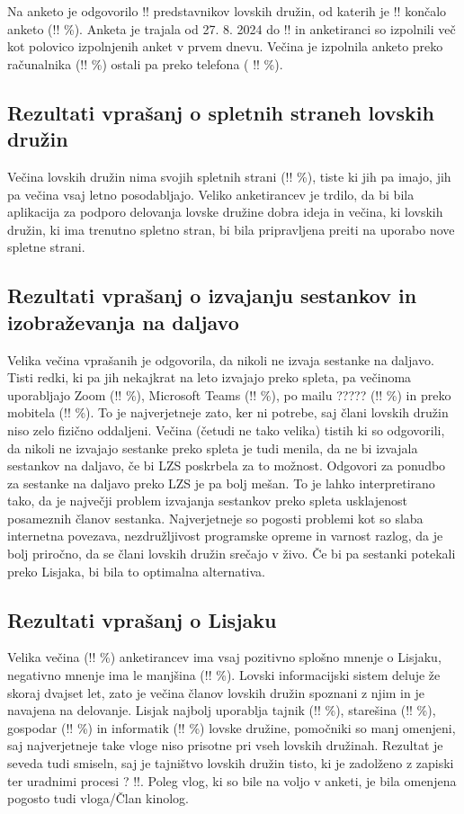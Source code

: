 \documentclass[a4paper,12pt,openright]{book}
\begin{document}
Na anketo je odgovorilo !! predstavnikov lovskih družin, od katerih je !! končalo anketo (!! \%).
Anketa je trajala od 27. 8. 2024 do !! in anketiranci so izpolnili več kot polovico izpolnjenih anket v prvem dnevu.
Večina je izpolnila anketo preko računalnika (!! \%) ostali pa preko telefona ( !! \%).

\subsection{Rezultati vprašanj o spletnih straneh lovskih družin}

Večina lovskih družin nima svojih spletnih strani (!! \%), tiste ki jih pa imajo, jih pa večina vsaj letno posodabljajo.
Veliko anketirancev je trdilo, da bi bila aplikacija za podporo delovanja lovske družine dobra ideja in večina, ki lovskih družin, ki ima trenutno spletno stran, bi bila pripravljena preiti na uporabo nove spletne strani.

\subsection{Rezultati vprašanj o izvajanju sestankov in izobraževanja na daljavo}

Velika večina vprašanih je odgovorila, da nikoli ne izvaja sestanke na daljavo. 
Tisti redki, ki pa jih nekajkrat na leto izvajajo preko spleta, pa večinoma uporabljajo Zoom (!! \%), Microsoft Teams (!! \%), po mailu ????? (!! \%) in preko mobitela (!! \%).
To je najverjetneje zato, ker ni potrebe, saj člani lovskih družin niso zelo fizično oddaljeni.
Večina (četudi ne tako velika) tistih ki so odgovorili, da nikoli ne izvajajo sestanke preko spleta je tudi menila, da ne bi izvajala sestankov na daljavo, če bi LZS poskrbela za to možnost.
Odgovori za ponudbo za sestanke na daljavo preko LZS je pa bolj mešan.
To je lahko interpretirano tako, da je največji problem izvajanja sestankov preko spleta usklajenost posameznih članov sestanka.
Najverjetneje so pogosti problemi kot so slaba internetna povezava, nezdružljivost programske opreme in varnost razlog, da je bolj priročno, da se člani lovskih družin srečajo v živo.
Če bi pa sestanki potekali preko Lisjaka, bi bila to optimalna alternativa.


\subsection{Rezultati vprašanj o Lisjaku}

Velika večina (!! \%) anketirancev ima vsaj pozitivno splošno mnenje o Lisjaku, negativno mnenje ima le manjšina  (!! \%).
Lovski informacijski sistem deluje že skoraj dvajset let, zato je večina članov lovskih družin spoznani z njim in je navajena na delovanje.
Lisjak najbolj uporablja tajnik (!! \%), starešina (!! \%), gospodar (!! \%) in informatik (!! \%) lovske družine, pomočniki so manj omenjeni, saj najverjetneje take vloge niso prisotne pri vseh lovskih družinah.
Rezultat je seveda tudi smiseln, saj je tajništvo lovskih družin tisto, ki je zadolženo z zapiski ter uradnimi procesi ? !!.
Poleg vlog, ki so bile na voljo v anketi, je bila omenjena pogosto tudi vloga/Član kinolog.
\end{document}
